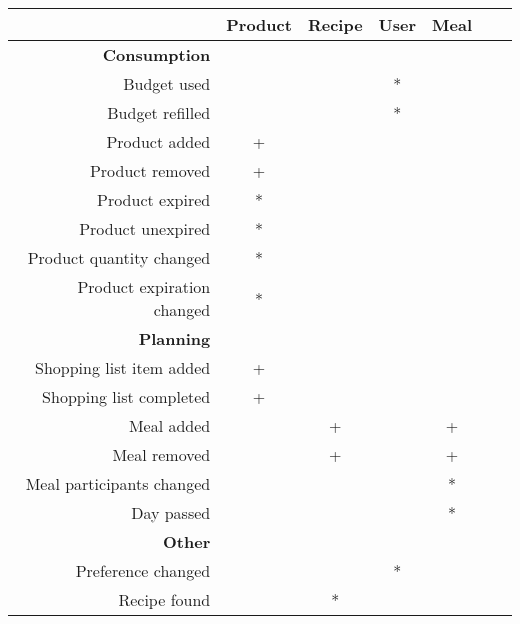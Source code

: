\begin{table}
\centering
\begin{tabular}{|r| c| c| c| c| c| c|}\hline
                                     & Product& Recipe & User & Meal \\\hline
 \textbf{Consumption}                &        &        &      &                  \\   
 \hline    
 Budget used    		             &        &        &   *  &                  \\
 Budget refilled		  	       &        &        &   *  &                  \\
 Product added	 		      	   &     +  &        &      &                  \\
 Product removed		      	   &     +  &        &      &                  \\
 Product expired		  	       &     *  &        &      &                  \\
 Product unexpired		  	       &     *  &        &      &                  \\
 Product quantity changed 	       &     *  &        &      &                  \\
 Product expiration changed 	       &     *  &        &      &                  \\
 \hline				
 \textbf{Planning}   	             &        &        &      &                  \\
 \hline 
 Shopping list item added     	   &     +  &        &      &       \\
 Shopping list completed  	       &     +  &        &      &       \\
 Meal added			  	  	       &        &      + &      &    +             \\
 Meal removed             	       &        &      + &      &    +  \\
 Meal participants changed 	       &        &        &      &    *             \\
 Day passed				  	       &        &        &      &    *             \\
 \hline           
 \textbf{Other}                      &        &        &      &                  \\ 
 \hline        
 Preference changed       	       &        &        &   *  &                  \\
 Recipe found                        &        &      * &      &        \\\hline          
\end{tabular}
\end{table}